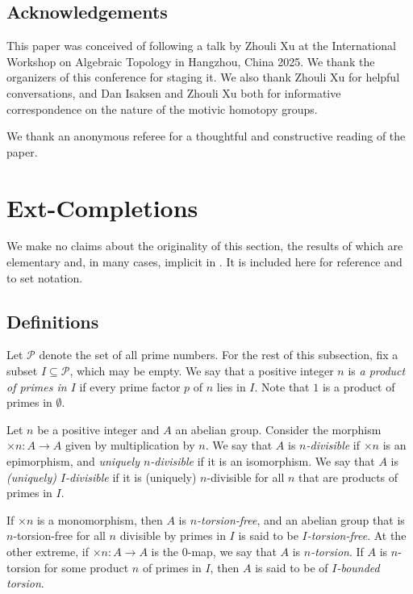 \documentclass[11pt, oneside, dvipsnames, svgnames, table, final]{amsart}
\theoremstyle{plain}
\theoremstyle{definition}
\theoremstyle{remark}
\newcommand{\sh}[1]{\mathcal{#1}}
\newcommand{\<}[1]{{\langle}#1 {\rangle}}
\begin{document}
\subsection{Acknowledgements}
\label{sec:acknowledgments}

This paper was conceived of following a talk by Zhouli Xu at the International Workshop on Algebraic Topology in Hangzhou, China 2025. We thank the organizers of this conference for staging it. We also thank Zhouli Xu for helpful conversations, and Dan Isaksen and Zhouli Xu both for informative correspondence on the nature of the motivic homotopy groups.

We thank an anonymous referee for a thoughtful and constructive reading of the paper.


\section{Ext-Completions}%
\label{sec:completions}

We make no claims about the originality of this section, the results of which are elementary and, in many cases, implicit in \cite{Rotman1968}. It is included here for reference and to set notation. 

\subsection{Definitions}
\label{sec:definitions}


Let $\sh P$ denote the set of all prime numbers. For the rest of this subsection, fix a subset $I \subseteq \sh P$, which may be empty. We say that a positive integer $n$ is \emph{a product of primes in $I$} if every prime factor $p$ of $n$ lies in $I$. Note that $1$ is a product of primes in $\emptyset$.

Let $n$ be a positive integer and $A$ an abelian group. Consider the morphism $\times n : A \to A$ given by multiplication by $n$. We say that $A$ is \emph{$n$-divisible} if $\times n$ is an epimorphism, and \emph{uniquely $n$-divisible} if it is an isomorphism. We say that $A$ is \emph{(uniquely) $I$-divisible} if it is (uniquely) $n$-divisible for all $n$ that are products of primes in $I$. %


If $\times n$ is a monomorphism, then $A$ is \emph{$n$-torsion-free}, and an abelian group that is $n$-torsion-free for all $n$ divisible by primes in $I$ is said to be \emph{$I$-torsion-free}. At the other extreme, if $\times n: A \to A$ is the $0$-map, we say that $A$ is \emph{$n$-torsion}. If $A$ is $n$-torsion for some product $n$ of primes in $I$, then $A$ is said to be of \emph{$I$-bounded torsion}.
\end{document}
